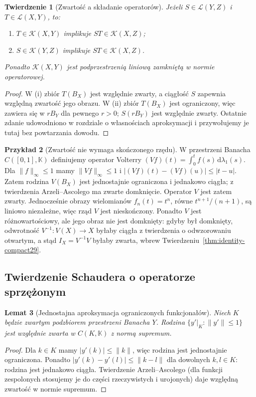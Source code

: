 \documentclass[11pt,a4paper]{article}
\numberwithin{equation}{section}
\theoremstyle{plain}
\newtheorem{twierdzenie}{Twierdzenie}[section]
\newtheorem{lemat}[twierdzenie]{Lemat}
\theoremstyle{definition}
\newtheorem{przyklad}[twierdzenie]{Przykład}
\theoremstyle{remark}
\newcommand{\K}{\mathbb K}
\begin{document}
\begin{twierdzenie}[Zwartość a składanie operatorów]
\label{thm:ideal-compact29}
Jeżeli $S\in\mathcal L(Y,Z)$ i $T\in\mathcal L(X,Y)$, to:
\begin{enumerate}[label=\textup{(\roman*)}]
\item $T\in\mathcal K(X,Y)$ implikuje
      $ST\in\mathcal K(X,Z)$;
\item $S\in\mathcal K(Y,Z)$ implikuje
      $ST\in\mathcal K(X,Z)$.
\end{enumerate}
Ponadto $\mathcal K(X,Y)$ jest podprzestrzenią liniową zamkniętą
w normie operatorowej.
\end{twierdzenie}
\begin{proof}
W (i) zbiór $T(B_X)$ jest względnie zwarty, a ciągłość $S$
zapewnia względną zwartość jego obrazu. W (ii) zbiór $T(B_X)$
jest ograniczony, więc zawiera się w $rB_Y$ dla pewnego $r>0$;
$S(rB_Y)$ jest względnie zwarty. Ostatnie zdanie udowodniono
w rozdziale o własnościach aproksymacji i przywołujemy je tutaj
bez powtarzania dowodu.
\end{proof}

\begin{przyklad}[Zwartość nie wymaga skończonego rzędu]
\label{ex:volterra29}
W przestrzeni Banacha $C([0,1],\K)$ definiujemy operator Volterry
$(Vf)(t)=\int_{0}^{t}f(s)\,\mathrm d\lambda_1(s)$.
Dla $\|f\|_\infty\le1$ mamy $\|Vf\|_\infty\le1$ i
$|(Vf)(t)-(Vf)(u)|\le|t-u|$. Zatem rodzina $V(B_X)$
jest jednostajnie ograniczona i jednakowo ciągła;
z twierdzenia Arzeli--Ascolego ma zwarte domknięcie.
Operator $V$ jest zatem zwarty. Jednocześnie obrazy wielomianów
$f_n(t)=t^n$, równe $t^{n+1}/(n+1)$, są liniowo niezależne,
więc rząd $V$ jest nieskończony. Ponadto $V$ jest różnowartościowy,
ale jego obraz nie jest domknięty: gdyby był domknięty, odwrotność
$V^{-1}:V(X)\to X$ byłaby ciągła z twierdzenia o odwzorowaniu
otwartym, a stąd $I_X=V^{-1}V$ byłaby zwarta, wbrew
Twierdzeniu~\ref{thm:identity-compact29}.
\end{przyklad}

\subsection{Twierdzenie Schaudera o operatorze sprzężonym}

\begin{lemat}[Jednostajna aproksymacja ograniczonych funkcjonałów]
\label{lem:restrictions29}
Niech $K$ będzie zwartym podzbiorem przestrzeni Banacha $Y$.
Rodzina $\{y'|_K:\|y'\|\le1\}$ jest względnie zwarta
w $C(K,\K)$ z normą supremum.
\end{lemat}
\begin{proof}
Dla $k\in K$ mamy $|y'(k)|\le\|k\|$, więc rodzina jest
jednostajnie ograniczona. Ponadto
$|y'(k)-y'(l)|\le\|k-l\|$ dla dowolnych $k,l\in K$:
rodzina jest jednakowo ciągła. Twierdzenie Arzeli--Ascolego
(dla funkcji zespolonych stosujemy je do części rzeczywistych
i urojonych) daje względną zwartość w normie supremum.
\end{proof}
\end{document}
